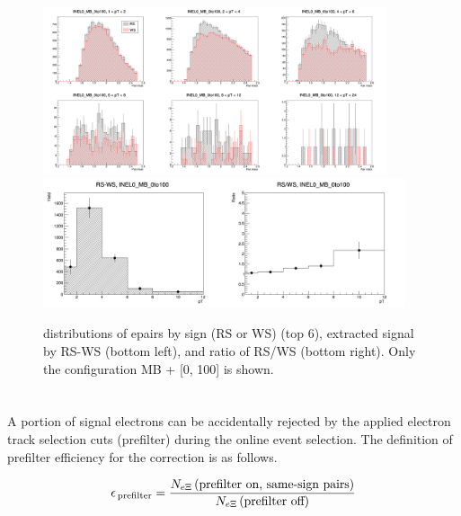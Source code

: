 \vspace{\columnsep}
\begin{figure}[h!]
    \centering
    \includegraphics[width=0.90\textwidth]{plots/s2_RSmWS_INEL0_MB_0to100.png} \\\vspace{2pt}
    \includegraphics[width=0.95\textwidth]{plots/s2_RSdWS_INEL0_MB_0to100.png}
    \caption{\pt distributions of e\Xim pairs by sign (RS or WS) (top 6), extracted signal by RS-WS (bottom left), and ratio of RS/WS (bottom right). Only the configuration MB + [0, 100] is shown.}
    \label{fig:s2_RSWS}
\end{figure}

\clearpage

\vspace{\columnsep}
\paragraph{}\mbox{}\\[1pt]
A portion of signal electrons can be accidentally rejected by the applied electron track selection cuts (prefilter) during the online event selection. The definition of prefilter efficiency for the correction is as follows.

\begin{equation}
    \epsilon_{\,\text{\rm prefilter}} =
    \frac{N_{e\Xi} \text{\rm \,(prefilter on, same-sign pairs)}}{N_{e\Xi} \text{\rm \,(prefilter off})}
\end{equation}

